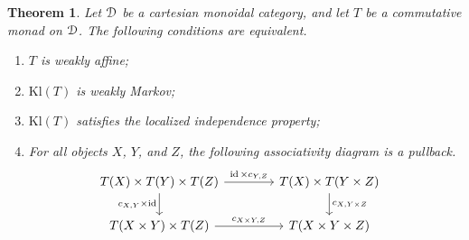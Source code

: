 \documentclass[a4paper,UKenglish,numberwithinsect,cleveref, autoref, thm-restate]{lipics-v2021}
\theoremstyle{plain} %
\newtheorem{mytheorem}{Theorem}[section]
\theoremstyle{definition} %
\begin{document}
\begin{mytheorem}
 Let $\mathcal{D}$ be a cartesian monoidal category, and let $T$ be a commutative monad on $\mathcal{D}$.
 The following conditions are equivalent.
 \begin{enumerate}
  \item\label{condgroup} $T$ is weakly affine;
  \item\label{condwm} $\mathrm{Kl}(T)$ is weakly Markov;
  \item\label{condlocal} $\mathrm{Kl}(T)$ satisfies the localized independence property;
  \item\label{condpullback} For all objects $X$, $Y$, and $Z$, the following associativity diagram is a pullback.
	\begin{equation}
		\label{assoc_pullback}
		\hspace{-9pt}	%
		\begin{tikzcd}[column sep=3.3pc]
			T(X) \times T(Y) \times T(Z) \ar{r}{\id \times c_{Y,Z}} \ar[swap]{d}{c_{X,Y} \times \id}	& T(X) \times T(Y \times Z) \ar{d}{c_{X,Y \times Z}}	\\
			T(X \times Y) \times T(Z) \ar{r}{c_{X\times Y,Z}}						& T(X \times Y \times Z)
		\end{tikzcd}
	\end{equation}
 \end{enumerate}
\end{mytheorem}
\end{document}
